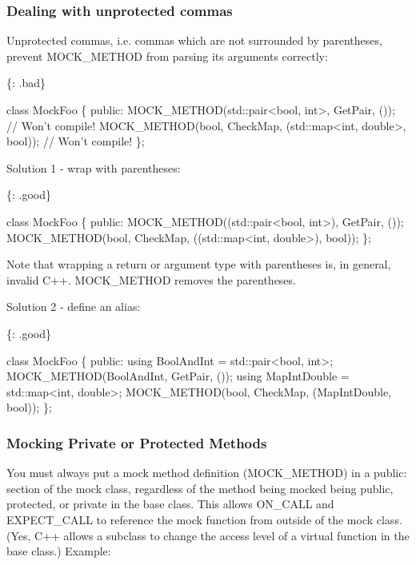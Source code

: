 \subsubsection*{Dealing with unprotected commas}

Unprotected commas, i.\+e. commas which are not surrounded by parentheses, prevent {\ttfamily M\+O\+C\+K\+\_\+\+M\+E\+T\+H\+OD} from parsing its arguments correctly\+:

\{\+: .bad\} 
\begin{DoxyCode}
\textcolor{keyword}{class }MockFoo \{
 \textcolor{keyword}{public}:
  MOCK\_METHOD(std::pair<bool, int>, GetPair, ());  \textcolor{comment}{// Won't compile!}
  MOCK\_METHOD(\textcolor{keywordtype}{bool}, CheckMap, (std::map<int, double>, \textcolor{keywordtype}{bool}));  \textcolor{comment}{// Won't compile!}
\};
\end{DoxyCode}


Solution 1 -\/ wrap with parentheses\+:

\{\+: .good\} 
\begin{DoxyCode}
\textcolor{keyword}{class }MockFoo \{
 \textcolor{keyword}{public}:
  MOCK\_METHOD((std::pair<bool, int>), GetPair, ());
  MOCK\_METHOD(\textcolor{keywordtype}{bool}, CheckMap, ((std::map<int, double>), \textcolor{keywordtype}{bool}));
\};
\end{DoxyCode}


Note that wrapping a return or argument type with parentheses is, in general, invalid C++. {\ttfamily M\+O\+C\+K\+\_\+\+M\+E\+T\+H\+OD} removes the parentheses.

Solution 2 -\/ define an alias\+:

\{\+: .good\} 
\begin{DoxyCode}
\textcolor{keyword}{class }MockFoo \{
 \textcolor{keyword}{public}:
  \textcolor{keyword}{using} BoolAndInt = std::pair<bool, int>;
  MOCK\_METHOD(BoolAndInt, GetPair, ());
  \textcolor{keyword}{using} MapIntDouble = std::map<int, double>;
  MOCK\_METHOD(\textcolor{keywordtype}{bool}, CheckMap, (MapIntDouble, \textcolor{keywordtype}{bool}));
\};
\end{DoxyCode}


\subsubsection*{Mocking Private or Protected Methods}

You must always put a mock method definition ({\ttfamily M\+O\+C\+K\+\_\+\+M\+E\+T\+H\+OD}) in a {\ttfamily public\+:} section of the mock class, regardless of the method being mocked being {\ttfamily public}, {\ttfamily protected}, or {\ttfamily private} in the base class. This allows {\ttfamily O\+N\+\_\+\+C\+A\+LL} and {\ttfamily E\+X\+P\+E\+C\+T\+\_\+\+C\+A\+LL} to reference the mock function from outside of the mock class. (Yes, C++ allows a subclass to change the access level of a virtual function in the base class.) Example\+:


